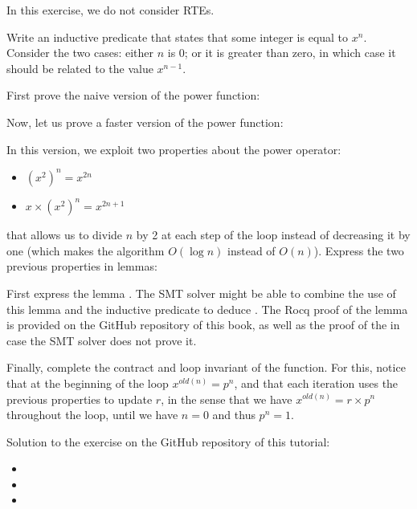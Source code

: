 

In this exercise, we do not consider RTEs.


Write an inductive predicate that states that some integer  is equal
to $x^n$. Consider the two cases: either $n$ is 0; or it is greater
than zero, in which case it
should be related to the value $x^{n-1}$.




First prove the naive version of the power function:




Now, let us prove a faster version of the power function:




In this version, we exploit two properties about the power operator:
\begin{itemize}
\item $(x^2)^n = x^{2n}$
\item $x \times (x^2)^n = x^{2n+1}$
\end{itemize}
that allows us to divide $n$ by 2 at each step of the loop instead of decreasing
it by one (which makes the algorithm $O(\log n)$ instead of $O(n)$). Express the
two previous properties in lemmas:




First express the lemma . The SMT solver might be able
to combine the use of this lemma and the inductive predicate to deduce
. The Rocq proof of the  lemma is
provided on the GitHub repository of this book, as well as the proof of the
 in case the SMT solver does not prove it.


Finally, complete the contract and loop invariant of the 
function. For this, notice that at the beginning of the loop $x^{old(n)} = p^n$,
and that each iteration uses the previous properties to update $r$, in the sense
that we have $x^{old(n)} = r \times p^n$ throughout the loop, until we have $n = 0$ and
thus $p^n = 1$.


\begin{Information}
  Solution to the exercise on the GitHub repository of this tutorial:
  \begin{itemize}
    \item {}
    \item {}
    \item {}
  \end{itemize}
\end{Information}


